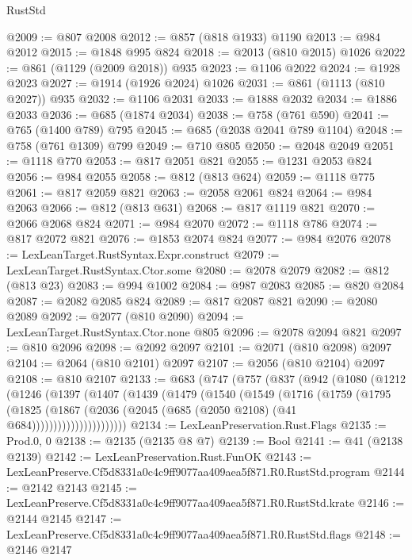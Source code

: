 \begin{lexlean}{RustStd}
\begin{coremodule}
@2009 := @807 @2008
@2012 := @857 (@818 @1933) @1190
@2013 := @984 @2012
@2015 := @1848 @995 @824
@2018 := @2013 (@810 @2015) @1026
@2022 := @861 (@1129 (@2009 @2018)) @935
@2023 := @1106 @2022
@2024 := @1928 @2023
@2027 := @1914 (@1926 @2024) @1026
@2031 := @861 (@1113 (@810 @2027)) @935
@2032 := @1106 @2031
@2033 := @1888 @2032
@2034 := @1886 @2033
@2036 := @685 (@1874 @2034)
@2038 := @758 (@761 @590)
@2041 := @765 (@1400 @789) @795
@2045 := @685 (@2038 @2041 @789 @1104)
@2048 := @758 (@761 @1309) @799
@2049 := @710 @805
@2050 := @2048 @2049
@2051 := @1118 @770
@2053 := @817 @2051 @821
@2055 := @1231 @2053 @824
@2056 := @984 @2055
@2058 := @812 (@813 @624)
@2059 := @1118 @775
@2061 := @817 @2059 @821
@2063 := @2058 @2061 @824
@2064 := @984 @2063
@2066 := @812 (@813 @631)
@2068 := @817 @1119 @821
@2070 := @2066 @2068 @824
@2071 := @984 @2070
@2072 := @1118 @786
@2074 := @817 @2072 @821
@2076 := @1853 @2074 @824
@2077 := @984 @2076
@2078 := LexLeanTarget.RustSyntax.Expr.construct
@2079 := LexLeanTarget.RustSyntax.Ctor.some
@2080 := @2078 @2079
@2082 := @812 (@813 @23)
@2083 := @994 @1002
@2084 := @987 @2083
@2085 := @820 @2084
@2087 := @2082 @2085 @824
@2089 := @817 @2087 @821
@2090 := @2080 @2089
@2092 := @2077 (@810 @2090)
@2094 := LexLeanTarget.RustSyntax.Ctor.none @805
@2096 := @2078 @2094 @821
@2097 := @810 @2096
@2098 := @2092 @2097
@2101 := @2071 (@810 @2098) @2097
@2104 := @2064 (@810 @2101) @2097
@2107 := @2056 (@810 @2104) @2097
@2108 := @810 @2107
@2133 := @683
    (@747
      (@757
        (@837
          (@942
            (@1080
              (@1212
                (@1246
                  (@1397
                    (@1407
                      (@1439
                        (@1479
                          (@1540
                            (@1549
                              (@1716
                                (@1759
                                  (@1795
                                    (@1825
                                      (@1867
                                        (@2036
                                          (@2045 (@685 (@2050 @2108) (@41 @684))))))))))))))))))))))
@2134 := LexLeanPreservation.Rust.Flags
@2135 := Prod.{0, 0}
@2138 := @2135 (@2135 @8 @7)
@2139 := Bool
@2141 := @41 (@2138 @2139)
@2142 := LexLeanPreservation.Rust.FunOK
@2143 := LexLeanPreserve.Cf5d8331a0c4c9ff9077aa409aea5f871.R0.RustStd.program
@2144 := @2142 @2143
@2145 := LexLeanPreserve.Cf5d8331a0c4c9ff9077aa409aea5f871.R0.RustStd.krate
@2146 := @2144 @2145
@2147 := LexLeanPreserve.Cf5d8331a0c4c9ff9077aa409aea5f871.R0.RustStd.flags
@2148 := @2146 @2147

\end{coremodule}
\end{lexlean}
